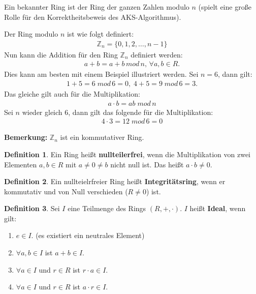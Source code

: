 \documentclass[12pt,oneside]{article}
\theoremstyle{remark}
\theoremstyle{definition}
\newtheorem{definition}{Definition}[section]
\begin{document}
Ein bekannter Ring ist der Ring der ganzen Zahlen modulo $n$ (spielt eine große Rolle für den Korrektheitsbeweis des AKS-Algorithmus).

Der Ring modulo $n$ ist wie folgt definiert:
\begin{align*}
    \mathbb{Z}_{n} = \{0,1,2, \dots, n - 1 \}
\end{align*}
Nun kann die Addition für den Ring $\mathbb{Z}_{n}$ definiert werden:
\begin{align*}
    a + b = a + b \, mod \, n, \, \forall a,b \in R.
\end{align*}
Dies kann am besten mit einem Beispiel illustriert werden. Sei $n = 6$, dann gilt:
\begin{align*}
    1 + 5 = 6 \; mod \, 6 = 0, \;  4 + 5 = 9 \; mod \, 6 = 3.
\end{align*}
Das gleiche gilt auch für die Multiplikation:
\begin{align*}
    a \cdot b = ab \; mod \, n
\end{align*}
Sei $n$ wieder gleich 6, dann gilt das folgende für die Multiplikation:
\begin{align*}
    4 \cdot 3 = 12 \; mod \, 6 = 0 
\end{align*}

\textbf{\small{Bemerkung:}} $\mathbb{Z}_{n}$ ist ein kommutativer Ring. 
\begin{definition}
Ein Ring heißt \textbf{nullteilerfrei}, wenn die Multiplikation von zwei Elementen $a,b \in R$ mit $a \neq 0 \neq b$ nicht null ist. Das heißt $a \cdot b \neq 0$.
\end{definition}

\begin{definition}
Ein nullteielrfreier Ring heißt \textbf{Integritätsring}, wenn er kommutativ und von Null verschieden ($R \neq 0$) ist. 
\end{definition}

\smallskip




\smallskip


\begin{definition}
Sei $I$ eine Teilmenge des Rings $(R,+,\cdot)$. $I$ heißt \textbf{Ideal}, wenn gilt:
\begin{enumerate}
    \item $e \in I$. (es existiert ein neutrales Element)
    \item $\forall a,b \in I$ ist $a + b \in I$.
    \item $\forall a \in I$ und $r \in R$ ist $r \cdot a \in I$.
    \item $\forall a \in I$ und $r \in R$ ist $a \cdot r \in I$.
\end{enumerate}
\end{definition}
\end{document}
